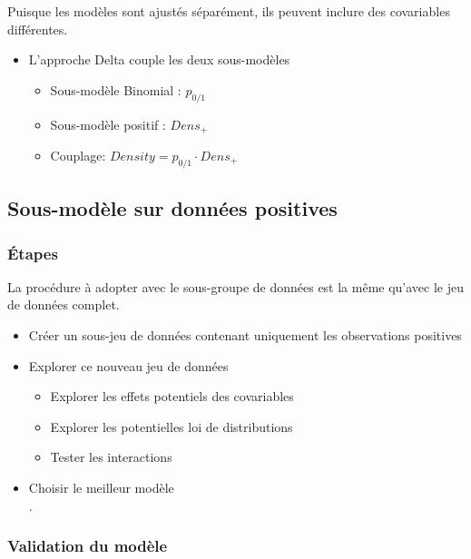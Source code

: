 \documentclass[french,a4paper]{article}
\providecommand{\tightlist}{%
  \setlength{\itemsep}{0pt}\setlength{\parskip}{0pt}}
\begin{document}
Puisque les modèles sont ajustés séparément, ils peuvent inclure des covariables différentes.

\begin{itemize}
\tightlist
\item
  L'approche Delta couple les deux sous-modèles

  \begin{itemize}
  \tightlist
  \item
    Sous-modèle Binomial : \(p_{0/1}\)
  \item
    Sous-modèle positif : \(Dens_{+}\)
  \item
    Couplage: \(Density = p_{0/1} \cdot Dens_{+}\)
  \end{itemize}
\end{itemize}

\hypertarget{sous-modele-sur-donnees-positives}{%
\subsection{Sous-modèle sur données positives}\label{sous-modele-sur-donnees-positives}}

\hypertarget{etapes-1}{%
\subsubsection{Étapes}\label{etapes-1}}

La procédure à adopter avec le sous-groupe de données est la même qu'avec le jeu de données complet.

\begin{itemize}
\tightlist
\item
  Créer un sous-jeu de données contenant uniquement les observations positives
\item
  Explorer ce nouveau jeu de données

  \begin{itemize}
  \tightlist
  \item
    Explorer les effets potentiels des covariables
  \item
    Explorer les potentielles loi de distributions
  \item
    Tester les interactions
  \end{itemize}
\item
  Choisir le meilleur modèle\\
  .
\end{itemize}

\hypertarget{validation-du-modele}{%
\subsubsection{Validation du modèle}\label{validation-du-modele}}
\end{document}
